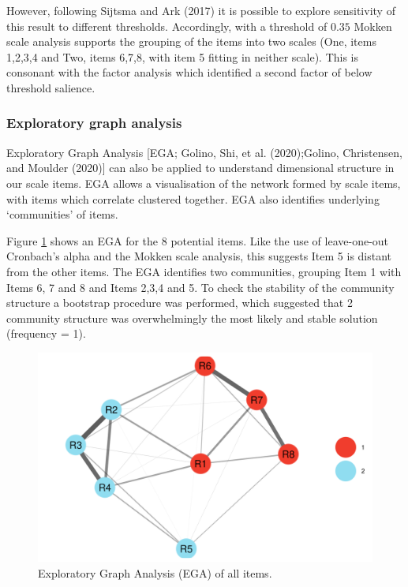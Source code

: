 \documentclass[
  ,jou,floatsintext]{apa6}
\begin{document}
However, following Sijtsma and Ark (2017) it is possible to explore sensitivity of this result to different thresholds. Accordingly, with a threshold of \(0.35\) Mokken scale analysis supports the grouping of the items into two scales (One, items 1,2,3,4 and Two, items 6,7,8, with item 5 fitting in neither scale). This is consonant with the factor analysis which identified a second factor of below threshold salience.

\hypertarget{exploratory-graph-analysis}{%
\subsubsection{Exploratory graph analysis}\label{exploratory-graph-analysis}}

Exploratory Graph Analysis {[}EGA; Golino, Shi, et al. (2020);Golino, Christensen, and Moulder (2020){]} can also be applied to understand dimensional structure in our scale items. EGA allows a visualisation of the network formed by scale items, with items which correlate clustered together. EGA also identifies underlying `communities' of items.

Figure \ref{fig:egafull} shows an EGA for the 8 potential items. Like the use of leave-one-out Cronbach's alpha and the Mokken scale analysis, this suggests Item 5 is distant from the other items. The EGA identifies two communities, grouping Item 1 with Items 6, 7 and 8 and Items 2,3,4 and 5. To check the stability of the community structure a bootstrap procedure was performed, which suggested that 2 community structure was overwhelmingly the most likely and stable solution (frequency = 1).

\begin{figure}

{\centering \includegraphics[width=1\linewidth]{plots/reason_ega} 

}

\caption{Exploratory Graph Analysis (EGA) of all items.}\label{fig:egafull}
\end{figure}
\end{document}

